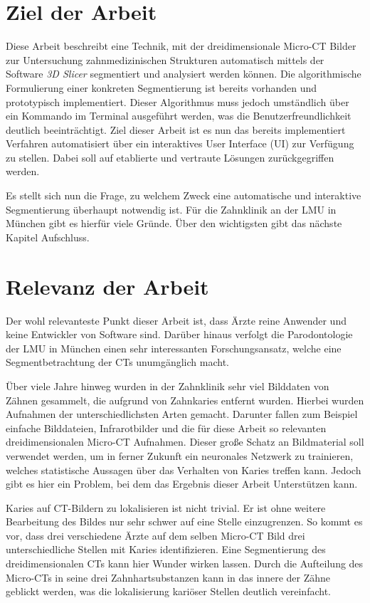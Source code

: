\section{Ziel der Arbeit}
\label{sec:ziel_der_arbeit} Diese Arbeit beschreibt eine Technik, mit der
dreidimensionale Micro-CT Bilder zur Untersuchung zahnmedizinischen Strukturen
automatisch mittels der Software \textit{3D Slicer} segmentiert und analysiert werden
können. Die algorithmische Formulierung einer konkreten Segmentierung ist
bereits vorhanden und prototypisch implementiert. Dieser Algorithmus muss jedoch
umständlich über ein Kommando im Terminal ausgeführt werden, was die
Benutzerfreundlichkeit deutlich beeinträchtigt. Ziel dieser Arbeit ist es nun das
bereits implementiert Verfahren automatisiert über ein interaktives User Interface
(UI) zur Verfügung zu stellen. Dabei soll auf etablierte und vertraute Lösungen
zurückgegriffen werden.

Es stellt sich nun die Frage, zu welchem Zweck eine automatische und interaktive
Segmentierung überhaupt notwendig ist. Für die Zahnklinik an der LMU in München
gibt es hierfür viele Gründe. Über den wichtigsten gibt das nächste Kapitel Aufschluss.

\section{Relevanz der Arbeit}
\label{sec:relevanz_der_arbeit} Der wohl relevanteste Punkt dieser Arbeit ist,
dass Ärzte reine Anwender und keine Entwickler von Software sind. Darüber hinaus
verfolgt die Parodontologie der LMU in München einen sehr interessanten Forschungsansatz,
welche eine Segmentbetrachtung der CTs unumgänglich macht.

Über viele Jahre hinweg wurden in der Zahnklinik sehr viel Bilddaten von Zähnen
gesammelt, die aufgrund von Zahnkaries entfernt wurden. Hierbei wurden Aufnahmen
der unterschiedlichsten Arten gemacht. Darunter fallen zum Beispiel einfache Bilddateien,
Infrarotbilder und die für diese Arbeit so relevanten dreidimensionalen Micro-CT
Aufnahmen. Dieser große Schatz an Bildmaterial soll verwendet werden, um in
ferner Zukunft ein neuronales Netzwerk zu trainieren, welches statistische Aussagen
über das Verhalten von Karies treffen kann. Jedoch gibt es hier ein Problem, bei
dem das Ergebnis dieser Arbeit Unterstützen kann.

Karies auf CT-Bildern zu lokalisieren ist nicht trivial. Er ist ohne weitere
Bearbeitung des Bildes nur sehr schwer auf eine Stelle einzugrenzen. So kommt es
vor, dass drei verschiedene Ärzte auf dem selben Micro-CT Bild drei
unterschiedliche Stellen mit Karies identifizieren. Eine Segmentierung des dreidimensionalen
CTs kann hier Wunder wirken lassen. Durch die Aufteilung des Micro-CTs in seine
drei Zahnhartsubstanzen kann in das innere der Zähne geblickt werden, was die lokalisierung
kariöser Stellen deutlich vereinfacht.

